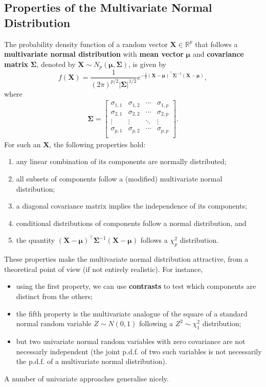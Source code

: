 \subsection{Properties of the Multivariate Normal Distribution}
The probability density function of a random vector $\mathbf{X}\in\mathbb{R}^p$ that follows a \textbf{multivariate normal distribution} with \textbf{mean vector} $\bm{\mu}$ and \textbf{covariance matrix} $\bm{\Sigma}$, denoted by $\bm{X}\sim N_p(\bm{\mu},\bm{\Sigma})$, is given by 
\begin{equation*}
f(\bm{X})=\frac{1}{(2\pi)^{p/2}|\bm{\Sigma}|^{1/2}}e^{-\frac{1}{2}(\bm{X}-\bm{\mu})^{\!\top}\bm{\Sigma}^{-1}(\bm{X}-\bm{\mu})},
\end{equation*}
where
\begin{gather*}
    \bm{\Sigma}=
    \begin{bmatrix}
    \sigma_{1,1} & \sigma_{1,2} & \cdots & \sigma_{1,p}\\
    \sigma_{2,1} & \sigma_{2,2} & \cdots & \sigma_{2,p}\\
    \vdots & \vdots &  \ddots & \vdots\\
    \sigma_{p,1} & \sigma_{p,2} & \cdots & \sigma_{p,p}\\
    \end{bmatrix}.  
\end{gather*}
For such an $\bm{X}$, the following properties hold:
\begin{enumerate}[noitemsep]
    \item any linear combination of its components are normally distributed;
    \item all subsets of components follow a (modified) multivariate normal distribution;
    \item a diagonal covariance matrix implies the independence of its components;
    \item conditional distributions of components follow a normal distribution, and 
    \item the quantity $(\bm{X}-\bm{\mu})^{\!\top}\bm{\Sigma}^{-1}(\bm{X}-\bm{\mu})$ follows a $\chi^{2}_{p}$ distribution.
\end{enumerate}
These properties make the multivariate normal distribution attractive, from a theoretical point of view (if not entirely realistic). For instance, 
\begin{itemize}[noitemsep]
\item using the first property, we can use \textbf{contrasts} to test which components are distinct from the others; \item the fifth property is the multivariate analogue of the square of a standard normal random variable $Z\sim N(0,1)$ following a $Z^2\sim \chi^2_1$ distribution;
\item but two univariate normal random variables with zero covariance are not necessarly independent (the joint p.d.f. of two such variables is not necessarily the p.d.f. of a multivariate normal distribution).
\end{itemize}
A number of univariate approaches generalise nicely. 
